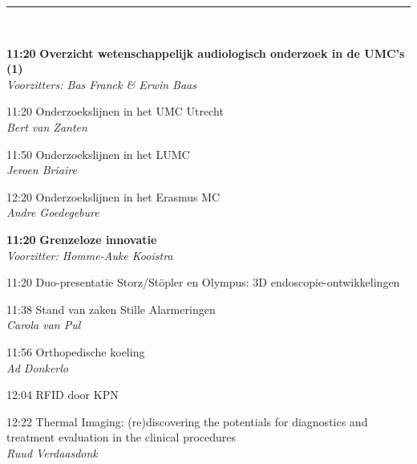 \documentclass[a4paper,10pt]{report}
\begin{document}
\begin{multicols*}{3}
\begin{packed_enum}
\end{packed_enum}

\hrule \vspace{3mm}
\vfill
{}\\

\begin{packed_enum}
\item[\textbf{11:20}] {\textbf{Overzicht wetenschappelijk audiologisch
    onderzoek in de UMC's (1)}}\\\textit{Voorzitters: Bas Franck \& Erwin Baas}
\item[11:20] Onderzoekslijnen in het UMC Utrecht\\\textit{Bert van Zanten}
\item[11:50] Onderzoekslijnen in het LUMC\\\textit{Jeroen Briaire}
\item[12:20] Onderzoekslijnen in het Erasmus MC\\\textit{Andre Goedegebure}
\end{packed_enum}

\vfill
{}
\begin{packed_enum}
\item[\textbf{11:20}]\textbf{Grenzeloze innovatie}\\\textit{Voorzitter: Homme-Auke Kooistra}
\item[11:20] Duo-presentatie Storz/St\"opler en Olympus: 3D endo\-sco\-pie-ontwikkelingen
\item[11:38] Stand van zaken Stille Alarmeringen\\\textit{Carola van Pul}
\item[11:56] Orthopedische koeling\\\textit{Ad Donkerlo}
\item[12:04] RFID door KPN
\item[12:22] Thermal Imaging: (re)discovering the potentials for diag\-nostics and treatment evaluation in the clinical procedures\\\textit{Ruud Verdaasdonk}
\end{packed_enum}
\columnbreak


\end{multicols*}
\end{document}
